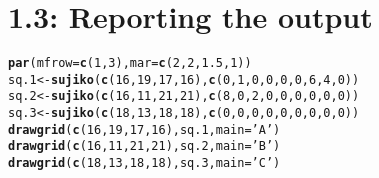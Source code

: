 \documentclass[12pt]{article}\usepackage[]{graphicx}\usepackage[]{color}
\makeatletter
\newcommand{\hlnum}[1]{\textcolor[rgb]{0.686,0.059,0.569}{#1}}%
\newcommand{\hlstr}[1]{\textcolor[rgb]{0.192,0.494,0.8}{#1}}%
\newcommand{\hlstd}[1]{\textcolor[rgb]{0.345,0.345,0.345}{#1}}%
\newcommand{\hlkwb}[1]{\textcolor[rgb]{0.69,0.353,0.396}{#1}}%
\newcommand{\hlkwc}[1]{\textcolor[rgb]{0.333,0.667,0.333}{#1}}%
\newcommand{\hlkwd}[1]{\textcolor[rgb]{0.737,0.353,0.396}{\textbf{#1}}}%
\newenvironment{kframe}{%
 \def\at@end@of@kframe{}%
 \ifinner\ifhmode%
  \def\at@end@of@kframe{\end{minipage}}%
  \begin{minipage}{\columnwidth}%
 \fi\fi%
 \def\FrameCommand##1{\hskip\@totalleftmargin \hskip-\fboxsep
 \colorbox{shadecolor}{##1}\hskip-\fboxsep
     \hskip-\linewidth \hskip-\@totalleftmargin \hskip\columnwidth}%
 \MakeFramed {\advance\hsize-\width
   \@totalleftmargin\z@ \linewidth\hsize
   \@setminipage}}%
 {\par\unskip\endMakeFramed%
 \at@end@of@kframe}
\newenvironment{knitrout}{}{} %
\makeatother
\begin{document}
\section{1.3: Reporting the output}
\begin{knitrout}
\color{fgcolor}\begin{kframe}
\begin{alltt}
\hlkwd{par}\hlstd{(}\hlkwc{mfrow}\hlstd{=}\hlkwd{c}\hlstd{(}\hlnum{1}\hlstd{,} \hlnum{3}\hlstd{),} \hlkwc{mar}\hlstd{=}\hlkwd{c}\hlstd{(}\hlnum{2}\hlstd{,} \hlnum{2}\hlstd{,} \hlnum{1.5}\hlstd{,} \hlnum{1}\hlstd{))}
\hlstd{sq.1} \hlkwb{<-} \hlkwd{sujiko}\hlstd{(}\hlkwd{c}\hlstd{(}\hlnum{16}\hlstd{,} \hlnum{19}\hlstd{,} \hlnum{17}\hlstd{,} \hlnum{16}\hlstd{),} \hlkwd{c}\hlstd{(}\hlnum{0}\hlstd{,} \hlnum{1}\hlstd{,} \hlnum{0}\hlstd{,} \hlnum{0}\hlstd{,} \hlnum{0}\hlstd{,} \hlnum{0}\hlstd{,} \hlnum{6}\hlstd{,} \hlnum{4}\hlstd{,} \hlnum{0}\hlstd{))}
\hlstd{sq.2} \hlkwb{<-} \hlkwd{sujiko}\hlstd{(}\hlkwd{c}\hlstd{(}\hlnum{16}\hlstd{,} \hlnum{11}\hlstd{,} \hlnum{21}\hlstd{,} \hlnum{21}\hlstd{),} \hlkwd{c}\hlstd{(}\hlnum{8}\hlstd{,} \hlnum{0}\hlstd{,} \hlnum{2}\hlstd{,} \hlnum{0}\hlstd{,} \hlnum{0}\hlstd{,} \hlnum{0}\hlstd{,} \hlnum{0}\hlstd{,} \hlnum{0}\hlstd{,} \hlnum{0}\hlstd{))}
\hlstd{sq.3} \hlkwb{<-} \hlkwd{sujiko}\hlstd{(}\hlkwd{c}\hlstd{(}\hlnum{18}\hlstd{,} \hlnum{13}\hlstd{,} \hlnum{18}\hlstd{,} \hlnum{18}\hlstd{),} \hlkwd{c}\hlstd{(}\hlnum{0}\hlstd{,} \hlnum{0}\hlstd{,} \hlnum{0}\hlstd{,} \hlnum{0}\hlstd{,} \hlnum{0}\hlstd{,} \hlnum{0}\hlstd{,} \hlnum{0}\hlstd{,} \hlnum{0}\hlstd{,} \hlnum{0}\hlstd{))}
\hlkwd{drawgrid}\hlstd{(}\hlkwd{c}\hlstd{(}\hlnum{16}\hlstd{,} \hlnum{19}\hlstd{,} \hlnum{17}\hlstd{,} \hlnum{16}\hlstd{), sq.1,} \hlkwc{main}\hlstd{=}\hlstr{'A'}\hlstd{)}
\hlkwd{drawgrid}\hlstd{(}\hlkwd{c}\hlstd{(}\hlnum{16}\hlstd{,} \hlnum{11}\hlstd{,} \hlnum{21}\hlstd{,} \hlnum{21}\hlstd{), sq.2,} \hlkwc{main}\hlstd{=}\hlstr{'B'}\hlstd{)}
\hlkwd{drawgrid}\hlstd{(}\hlkwd{c}\hlstd{(}\hlnum{18}\hlstd{,} \hlnum{13}\hlstd{,} \hlnum{18}\hlstd{,} \hlnum{18}\hlstd{), sq.3,} \hlkwc{main}\hlstd{=}\hlstr{'C'}\hlstd{)}
\end{alltt}
\end{kframe}
\end{knitrout}
\end{document}
